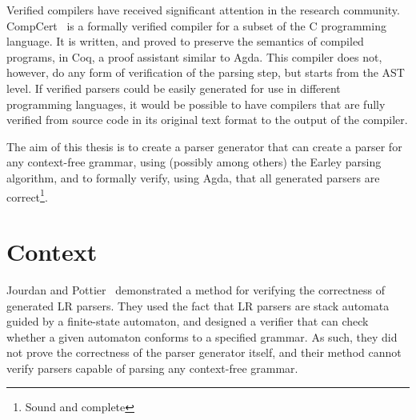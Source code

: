 \documentclass{article}
\begin{document}
	Verified compilers have received significant attention in the research
	community. CompCert~\cite{Leroy} is a formally verified compiler for a
	subset of the C programming language. It is written, and proved to preserve
	the semantics of compiled programs, in Coq, a proof assistant similar to
	Agda. This compiler does not, however, do any form of verification of the
	parsing step, but starts from the AST level. If verified parsers could be
	easily generated for use in different programming languages, it would be
	possible to have compilers that are fully verified from source code in its
	original text format to the output of the compiler.

	The aim of this thesis is to create a parser generator that can create a
	parser for any context-free grammar, using (possibly among others) the
	Earley parsing algorithm, and to formally verify, using Agda, that all
	generated parsers are correct\footnote{Sound and complete}.




\section{Context}


	Jourdan and Pottier~\cite{Jourdan} demonstrated a method for verifying the
	correctness of generated LR parsers. They used the fact that LR parsers are
	stack automata guided by a finite-state automaton, and designed a verifier
	that can check whether a given automaton conforms to a specified grammar.
	As such, they did not prove the correctness of the parser generator itself,
	and their method cannot verify parsers capable of parsing any context-free
	grammar.
\end{document}
